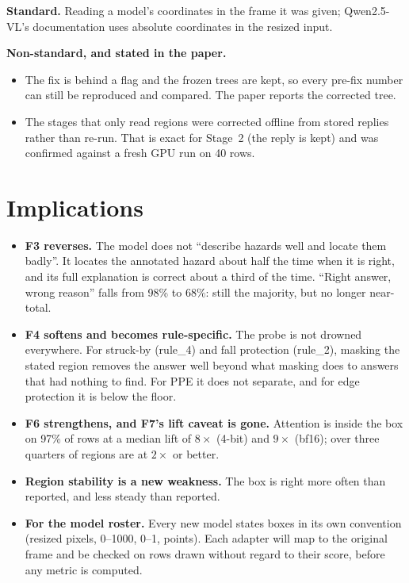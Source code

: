 \textbf{Standard.} Reading a model's coordinates in the frame it was given; Qwen2.5-VL's documentation
uses absolute coordinates in the resized input.

\textbf{Non-standard, and stated in the paper.}
\begin{itemize}
\item The fix is behind a flag and the frozen trees are kept, so every pre-fix number can still be
reproduced and compared. The paper reports the corrected tree.
\item The stages that only read regions were corrected offline from stored replies rather than re-run.
That is exact for Stage~2 (the reply is kept) and was confirmed against a fresh GPU run on 40 rows.
\end{itemize}

\section{Implications}

\begin{itemize}
\item \textbf{F3 reverses.} The model does not ``describe hazards well and locate them badly''. It
locates the annotated hazard about half the time when it is right, and its full explanation is correct
about a third of the time. ``Right answer, wrong reason'' falls from 98\% to 68\%: still the majority,
but no longer near-total.
\item \textbf{F4 softens and becomes rule-specific.} The probe is not drowned everywhere. For struck-by
(rule\_4) and fall protection (rule\_2), masking the stated region removes the answer well beyond what
masking does to answers that had nothing to find. For PPE it does not separate, and for edge protection
it is below the floor.
\item \textbf{F6 strengthens, and F7's lift caveat is gone.} Attention is inside the box on 97\% of rows
at a median lift of $8\times$ (4-bit) and $9\times$ (bf16); over three quarters of regions are at
$2\times$ or better.
\item \textbf{Region stability is a new weakness.} The box is right more often than reported, and less
steady than reported.
\item \textbf{For the model roster.} Every new model states boxes in its own convention (resized pixels,
0--1000, 0--1, points). Each adapter will map to the original frame and be checked on rows drawn without
regard to their score, before any metric is computed.
\end{itemize}
